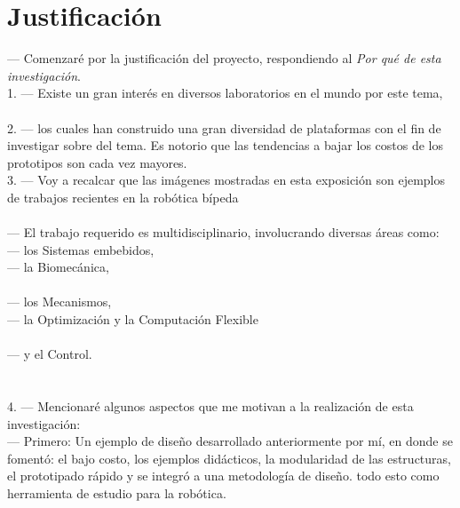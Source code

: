 \documentclass[10pt,letterpaper,oneside,onecolumn]{article}
\newcommand{\nnext}{\quad[\quad$\unrhd$\quad]}
\newcommand{\anext}{\quad[\quad$\rhd$\quad]}
\newcommand{\ngoto}{\quad[\quad$\boxtimes$\quad]}
\newcommand{\bato}{\quad[\quad$\boxdot$\quad]}
\begin{document}
{  \section{Justificaci\'on}
  \label{sec:justificacion}

  --- Comenzar\'e por la justificaci\'on del proyecto, respondiendo al \emph{Por qu\'e de esta investigaci\'on}.\anext{}\\
  1. --- Existe un gran inter\'es en diversos laboratorios en el mundo por este tema,\anext\\
\\
  2. --- los cuales han construido una gran diversidad de plataformas con el fin de investigar sobre del tema. Es notorio que las tendencias a bajar los costos de los prototipos son cada vez mayores.\anext{}\\
  3. --- Voy a recalcar que las im\'agenes mostradas en esta exposici\'on son ejemplos de trabajos recientes en la rob\'otica b\'ipeda\anext\\
\\
  --- El trabajo requerido es multidisciplinario, involucrando diversas \'areas como:\\
  --- los Sistemas embebidos\ngoto\bato,\\
  --- la Biomec\'anica\ngoto\bato,\\\\
  --- los Mecanismos\ngoto\bato,\\
  --- la Optimizaci\'on y la Computaci\'on Flexible\ngoto\bato\\\\
  --- y el Control.\ngoto\bato{}\\
\anext\\\\
  4. --- Mencionar\'e algunos aspectos que me motivan a la realizaci\'on de esta investigaci\'on:\anext{}\\
  --- Primero: Un ejemplo de dise\~no desarrollado anteriormente por m\'i, en donde se foment\'o: el bajo costo\anext, los ejemplos did\'acticos\anext, la modularidad de las estructuras\anext, el prototipado r\'apido\nnext{} y se integr\'o a una metodolog\'ia de dise\~no. todo esto como herramienta de estudio para la rob\'otica.\anext\\
}
\end{document}
